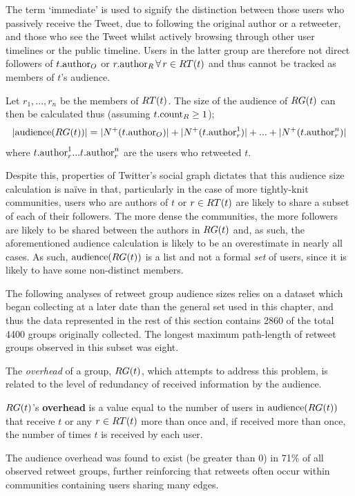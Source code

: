 The term `immediate' is used to signify the distinction between those users who passively receive the Tweet, due to following the original author or a retweeter, and those who see the Tweet whilst actively browsing through other user timelines or the public timeline. Users in the latter group are therefore not direct followers of $t.\textrm{author}_O$ or $r.\textrm{author}_R \, \forall \, r \in RT(t)$ and thus cannot be tracked as members of $t$'s audience.

Let $ r_1,...,r_n $ be the members of $RT(t)$. The size of the audience of $RG(t)$ can then be calculated thus (assuming $t.\textrm{count}_R \geq 1$);
\[
	|\textrm{audience}(RG(t))| = |N^+(t.\textrm{author}_O)| + |N^+(t.\textrm{author}_r^1)| + ... + |N^+(t.\textrm{author}_r^n)| 
\]
where $t.\textrm{author}_r^1 ... t.\textrm{author}_r^n$ are the users who retweeted $t$.

Despite this, properties of Twitter's social graph dictates that this audience size calculation is na{\"i}ve in that, particularly in the case of more tightly-knit communities, users who are authors of $t$ or $r \in RT(t)$ are likely to share a subset of each of their followers. The more dense the communities, the more followers are likely to be shared between the authors in $RG(t)$ and, as such, the aforementioned audience calculation is likely to be an overestimate in nearly all cases. As such, $\textrm{audience}(RG(t))$ is a list and not a formal \textit{set} of users, since it is likely to have some non-distinct members.

The following analyses of retweet group audience sizes relies on a dataset which began collecting at a later date than the general set used in this chapter, and thus the data represented in the rest of this section contains 2860 of the total 4400 groups originally collected. The longest maximum path-length of retweet groups observed in this subset was eight.

The \textit{overhead} of a group, $RG(t)$, which attempts to address this problem, is related to the level of redundancy of received information by the audience.

\begin{mydefinition}
    $RG(t)$'s \textbf{overhead} is a value equal to the number of users in $\textrm{audience}(RG(t))$ that receive $t$ or any $r \in RT(t)$ more than once and, if received more than once, the number of times $t$ is received by each user.
\end{mydefinition}

The audience overhead was found to exist (be greater than 0) in 71\% of all observed retweet groups, further reinforcing that retweets often occur within communities containing users sharing many edges.

